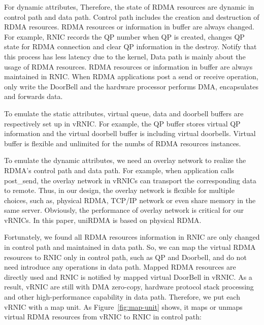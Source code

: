 For dynamic attributes, Therefore, the state of RDMA resources are dynamic in control path and data path. Control path includes the creation and destruction of RDMA resources. RDMA resources or information in buffer are always changed. For example, RNIC records the QP number when QP is created, changes QP state for RDMA connection and clear QP information in the destroy. Notify that this process has less latency due to the kernel, Data path is mainly about the usage of RDMA resources. RDMA resources or information in buffer are always maintained in RNIC. When RDMA applications post a send or receive operation, only write the DoorBell and the hardware processor performs DMA, encapsulates and forwards data.

To emulate the static attributes, virtual queue, data and doorbell buffers are respectively set up in vRNIC. For example, the QP buffer stores virtual QP information and the virtual doorbell buffer is including virtual doorbells. Virtual buffer is flexible and unlimited for the numbs of RDMA resources instances. 

To emulate the dynamic attributes, we need an overlay network to realize the RDMA's control path and data path. For example, when application calls post\_send, the overlay network in vRNICs can transport the corresponding data to remote. Thus, in our design, the overlay network is flexible for multiple choices, such as, physical RDMA, TCP/IP network or even share memory in the same server. Obviously, the performance of overlay network is critical for our vRNICs. In this paper, uniRDMA is based on physical RDMA.

Fortunately, we found all RDMA resources information in RNIC are only changed in control path and maintained in data path. So, we can map the virtual RDMA resources to RNIC only in control path, such as QP and Doorbell,  and do not need introduce any operations in data path. Mapped RDMA resources are directly used and RNIC is notified by mapped virtual DoorBell in vRNIC. As a result, vRNIC are still with DMA zero-copy, hardware protocol stack processing and other high-performance capability in data path. Therefore, we put each vRNIC with a map unit. As Figure~\ref{fig:map-unit} shows, it maps or unmaps virtual RDMA resources from vRNIC to RNIC in control path:


